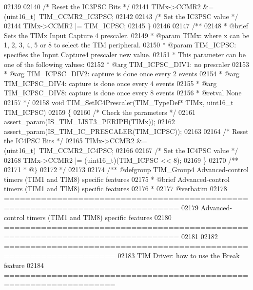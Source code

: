 \begin{DoxyCode}
02139 
02140   \textcolor{comment}{/* Reset the IC3PSC Bits */}
02141   TIMx->CCMR2 &= (uint16\_t)~TIM_CCMR2_IC3PSC;
02142 
02143   \textcolor{comment}{/* Set the IC3PSC value */}
02144   TIMx->CCMR2 |= TIM\_ICPSC;
02145 \}
02146 
02147 \textcolor{comment}{/**}
02148 \textcolor{comment}{  * @brief  Sets the TIMx Input Capture 4 prescaler.}
02149 \textcolor{comment}{  * @param  TIMx: where x can be 1, 2, 3, 4, 5 or 8 to select the TIM peripheral.}
02150 \textcolor{comment}{  * @param  TIM\_ICPSC: specifies the Input Capture4 prescaler new value.}
02151 \textcolor{comment}{  *          This parameter can be one of the following values:}
02152 \textcolor{comment}{  *            @arg TIM\_ICPSC\_DIV1: no prescaler}
02153 \textcolor{comment}{  *            @arg TIM\_ICPSC\_DIV2: capture is done once every 2 events}
02154 \textcolor{comment}{  *            @arg TIM\_ICPSC\_DIV4: capture is done once every 4 events}
02155 \textcolor{comment}{  *            @arg TIM\_ICPSC\_DIV8: capture is done once every 8 events}
02156 \textcolor{comment}{  * @retval None}
02157 \textcolor{comment}{  */}
02158 \textcolor{keywordtype}{void} TIM_SetIC4Prescaler(TIM\_TypeDef* TIMx, uint16\_t TIM\_ICPSC)
02159 \{
02160   \textcolor{comment}{/* Check the parameters */}
02161   assert_param(IS\_TIM\_LIST3\_PERIPH(TIMx));
02162   assert_param(IS\_TIM\_IC\_PRESCALER(TIM\_ICPSC));
02163 
02164   \textcolor{comment}{/* Reset the IC4PSC Bits */}
02165   TIMx->CCMR2 &= (uint16\_t)~TIM_CCMR2_IC4PSC;
02166 
02167   \textcolor{comment}{/* Set the IC4PSC value */}
02168   TIMx->CCMR2 |= (uint16\_t)(TIM\_ICPSC << 8);
02169 \}
02170 \textcolor{comment}{/**}
02171 \textcolor{comment}{  * @\}}
02172 \textcolor{comment}{  */}
02173 
02174 \textcolor{comment}{/** @defgroup TIM\_Group4 Advanced-control timers (TIM1 and TIM8) specific features}
02175 \textcolor{comment}{ *  @brief   Advanced-control timers (TIM1 and TIM8) specific features}
02176 \textcolor{comment}{ *}
02177 \textcolor{comment}{@verbatim   }
02178 \textcolor{comment}{ ===============================================================================}
02179 \textcolor{comment}{          Advanced-control timers (TIM1 and TIM8) specific features}
02180 \textcolor{comment}{ ===============================================================================  }
02181 \textcolor{comment}{  }
02182 \textcolor{comment}{       ===================================================================      }
02183 \textcolor{comment}{              TIM Driver: how to use the Break feature}
02184 \textcolor{comment}{       =================================================================== }

\end{DoxyCode}
